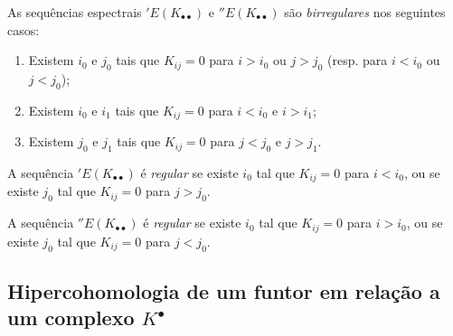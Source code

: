 \begin{env}[11.3.6]
\label{0.11.3.6}
As sequências espectrais $'E(K_{\bullet\bullet})$ e $''E(K_{\bullet\bullet})$ são \emph{birregulares} nos seguintes casos:
\begin{enumerate}
  \item[(a) ] Existem $i_0$ e $j_0$ tais que $K_{ij}=0$ para $i>i_0$ ou $j>j_0$ (resp. para $i<i_0$
    ou $j<j_0$);
  \item[(b) ] Existem $i_0$ e $i_1$ tais que $K_{ij}=0$ para $i<i_0$ e $i>i_1$;
  \item[(c) ] Existem $j_0$ e $j_1$ tais que $K_{ij}=0$ para $j<j_0$ e $j>j_1$.
\end{enumerate}

A sequência $'E(K_{\bullet\bullet})$ é \emph{regular} se existe $i_0$ tal que $K_{ij}=0$ para $i<i_0$, ou se existe $j_0$ tal que $K_{ij}=0$ para $j>j_0$.

A sequência $''E(K_{\bullet\bullet})$ é \emph{regular} se existe $i_0$ tal que $K_{ij}=0$ para $i>i_0$, ou se existe $j_0$ tal que $K_{ij}=0$ para $j<j_0$.
\end{env}


\subsection{Hipercohomologia de um funtor em relação a um complexo $K^{\bullet}$}
\label{subsection:0.11.4}


